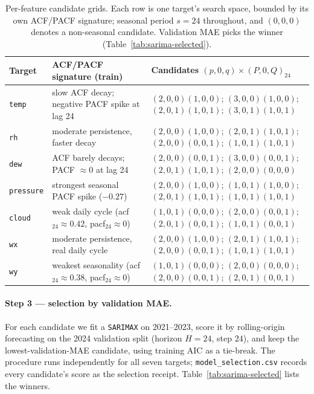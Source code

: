 \documentclass[12pt,a4paper,oneside]{report}
\begin{document}
\begin{table}[H]
\centering
\caption{Per-feature candidate grids. Each row is one target's search space,
bounded by its own ACF/PACF signature; seasonal period $s=24$ throughout, and
$(0,0,0)$ denotes a non-seasonal candidate. Validation MAE picks the winner
(Table~\ref{tab:sarima-selected}).}
\label{tab:sarima-grid}
\footnotesize
\begin{tabularx}{\textwidth}{l X l}
\toprule
\textbf{Target} & \textbf{ACF/PACF signature (train)} & \textbf{Candidates $(p,0,q)\!\times\!(P,0,Q)_{24}$} \\
\midrule
\texttt{temp}     & slow ACF decay; negative PACF spike at lag 24 & $(2,0,0)(1,0,0)$; $(3,0,0)(1,0,0)$; $(2,0,1)(1,0,1)$; $(3,0,1)(1,0,1)$ \\
\texttt{rh}       & moderate persistence, faster decay & $(2,0,0)(1,0,0)$; $(2,0,1)(1,0,1)$; $(2,0,0)(0,0,1)$; $(1,0,1)(1,0,1)$ \\
\texttt{dew}      & ACF barely decays; PACF $\approx 0$ at lag 24 & $(2,0,0)(0,0,1)$; $(3,0,0)(0,0,1)$; $(2,0,1)(1,0,1)$; $(2,0,0)(0,0,0)$ \\
\texttt{pressure} & strongest seasonal PACF spike ($-0.27$) & $(2,0,0)(1,0,0)$; $(1,0,1)(1,0,0)$; $(2,0,1)(1,0,1)$; $(1,0,1)(1,0,1)$ \\
\texttt{cloud}    & weak daily cycle (acf$_{24}\!\approx\!0.42$, pacf$_{24}\!\approx\!0$) & $(1,0,1)(0,0,0)$; $(2,0,0)(0,0,1)$; $(2,0,1)(0,0,1)$; $(1,0,1)(0,0,1)$ \\
\texttt{wx}       & moderate persistence, real daily cycle & $(2,0,0)(1,0,0)$; $(2,0,1)(1,0,1)$; $(2,0,0)(0,0,1)$; $(1,0,1)(1,0,1)$ \\
\texttt{wy}       & weakest seasonality (acf$_{24}\!\approx\!0.38$, pacf$_{24}\!\approx\!0$) & $(1,0,1)(0,0,0)$; $(2,0,0)(0,0,0)$; $(2,0,0)(0,0,1)$; $(2,0,1)(0,0,1)$ \\
\bottomrule
\end{tabularx}
\end{table}

\paragraph{Step 3 --- selection by validation MAE.}
For each candidate we fit a \texttt{SARIMAX} on 2021--2023, score it by
rolling-origin forecasting on the 2024 validation split (horizon $H{=}24$, step
$24$), and keep the lowest-validation-MAE candidate, using training AIC as a
tie-break. The procedure runs independently for all seven targets;
\texttt{model\_selection.csv} records every candidate's score as the selection
receipt. Table~\ref{tab:sarima-selected} lists the winners.
\end{document}
